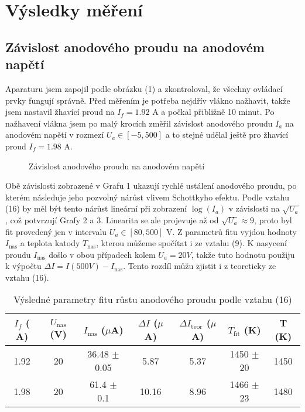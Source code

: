 \documentclass[a4paper,11pt]{article}
\begin{document}
\newpage

\section{Výsledky měření}

\subsection{Závislost anodového proudu na anodovém napětí}

Aparaturu jsem zapojil podle obrázku (1) a zkontroloval, že všechny ovládací prvky fungují správně. Před měřením je potřeba nejdřív vlákno nažhavit, takže jsem nastavil žhavící proud na $ I_f = 1.92 $ A a počkal přibližně 10 minut. Po nažhavení vlákna jsem po malý krocích změřil závislost anodového proudu $ I_a $  na anodovém napětí v rozmezí $ U_a \in [-5, 500] $ a to stejné udělal ještě pro žhavící proud $ I_f = 1.98 $ A. 

\begin{figure}[h]
    \centering
    \resizebox{0.45\textwidth}{!}{  }
    \captionsetup{type=graph}
    \caption{ Závislost anodového proudu na anodovém napětí}
\end{figure}

Obě závislosti zobrazené v Grafu 1 ukazují rychlé ustálení anodového proudu, po kterém následuje jeho pozvolný nárůst vlivem Schottkyho efektu. Podle vztahu (16) by měl být tento nárůst lineární při zobrazení $ \log(I_a) $ v závislosti na $ \sqrt{U_a}  $, což potvrzují Grafy 2 a 3. Linearita se ale projevuje až od $\sqrt{U_a} \approx 9$, proto byl fit provedený jen v intervalu $U_a \in [80, 500]$ V. Z parametrů fitu vyjdou hodnoty $ I_{\text{nas}} $ a teplota katody $ T_{\text{nas}} $, kterou můžeme spočítat i ze vztahu (9). K nasycení proudu $ I_{\text{nas}} $  došlo v obou případech kolem $ U_a = 20 V $, takže tuto hodnotu použiju k výpočtu $ \Delta I = I(500 V) - I_{\text{nas}} $. Tento rozdíl můžu zjistit i z teoreticky ze vztahu (16).

\begin{table}[h]
    \centering
    \begin{tabular}{| c | c c | c c | c c |}
        \hline
        $ I_f $ ($ $A) & $ U_{\text{nas}} $ (V) & $ I_{\text{nas}} $ ($  \mu$A) & $ \Delta I $   ($ \mu $ A) & $ \Delta I_{\text{teor}} $ ($ \mu  $A)  & $ T_{\text{fit}} $  (K) & T (K)  \\
        \hline
        1.92 & 20 & 36.48 $ \pm $  0.05 & 5.87 & 5.37 & 1450 $ \pm $ 20 & 1450 \\
        1.98 & 20 & 61.4 $ \pm $  0.1 & 10.16 & 8.96 & 1466 $ \pm $ 23 & 1480 \\
        \hline
    \end{tabular}
    \caption{ Výsledné parametry fitu růstu anodového proudu podle vztahu (16) }
\end{table}
\vspace{-40pt}
\end{document}
